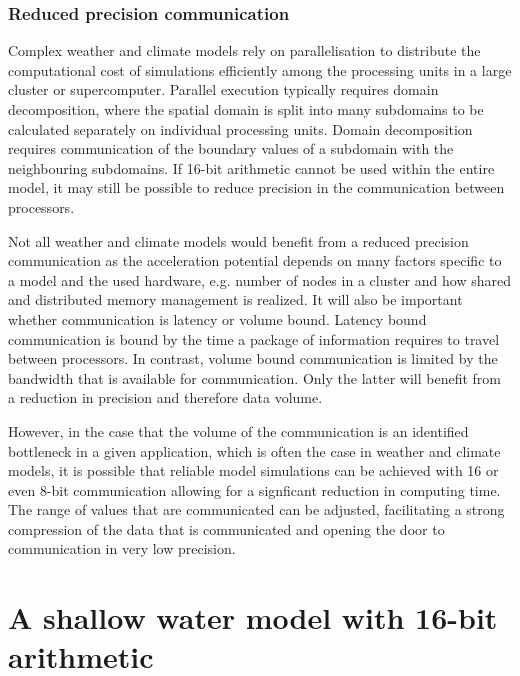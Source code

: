\documentclass[draft]{agujournal2019}
\begin{document}
\subsubsection{Reduced precision communication}

Complex weather and climate models rely on parallelisation to distribute the
computational cost of simulations efficiently among the processing units in a
large cluster or supercomputer. Parallel execution typically requires domain
decomposition, where the spatial domain is split into many subdomains to be
calculated separately on individual processing units. Domain decomposition
requires communication of the boundary values of a subdomain with the
neighbouring subdomains. If 16-bit arithmetic cannot be used within the
entire model, it may still be possible to reduce precision in the communication
between processors.

Not all weather and climate models would benefit from a reduced precision
communication as the acceleration potential depends on many factors specific
to a model and the used hardware, e.g. number of nodes in a cluster and how
shared and distributed memory management is realized. It will also be important
whether communication is latency or volume bound. Latency bound communication is
bound by the time a package of information requires to travel between processors.
In contrast, volume bound communication is limited by the bandwidth that is
available for communication. Only the latter will benefit from a reduction in
precision and therefore data volume.

However, in the case that the volume of the communication is an identified
bottleneck in a given application, which is often the case in weather and
climate models, it is possible that reliable model simulations can be achieved
with 16 or even 8-bit communication allowing for a signficant reduction in
computing time. The range of values that are communicated can be adjusted,
facilitating a strong compression of the data that is communicated and
opening the door to communication in very low precision.

\section{A shallow water model with 16-bit arithmetic}
\label{sec:swm}
\end{document}
